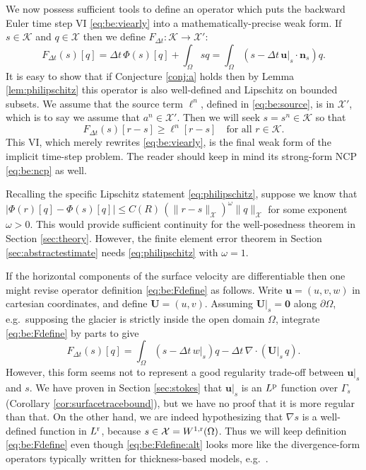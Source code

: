 \documentclass[hidelinks,onefignum,onetabnum,final]{siamart220329}  %
\newcommand{\grad}{\nabla}
\newcommand{\Div}{\nabla\cdot}
\newcommand{\bn}{\mathbf{n}}
\newcommand{\bu}{\mathbf{u}}
\newcommand{\bU}{\mathbf{U}}
\newcommand{\bzero}{\bm{0}}
\newcommand{\cK}{\mathcal{K}}
\newcommand{\cX}{\mathcal{X}}
\newcommand{\pp}{{\text{\textnormal{p}}}}
\newcommand{\rr}{{\text{\textnormal{r}}}}
\begin{document}
We now possess sufficient tools to define an operator which puts the backward Euler time step VI \eqref{eq:be:viearly} into a mathematically-precise weak form.  If $s\in\cK$ and $q\in\cX$ then we define $F_{\Delta t}:\cK\to\cX'$:
\begin{equation}
F_{\Delta t}(s)[q] = \Delta t\,\Phi(s)[q] + \int_\Omega s q = \int_\Omega \left(s - \Delta t\, \bu|_s \cdot \bn_s\right) q.  \label{eq:be:Fdefine}
\end{equation}
It is easy to show that if Conjecture \ref{conj:a} holds then by Lemma \ref{lem:philipschitz} this operator is also well-defined and Lipschitz on bounded subsets.  We assume that the source term $\ell^n$, defined in \eqref{eq:be:source}, is in $\cX'$, which is to say we assume that $a^n\in\cX'$.  Then we will seek $s = s^n \in \cK$ so that
\begin{equation}
\boxed{F_{\Delta t}(s)[r-s] \ge \ell^n[r-s] \quad \text{for all } r \in \cK.} \label{eq:be:vi}
\end{equation}
This VI, which merely rewrites \eqref{eq:be:viearly}, is the final weak form of the implicit time-step problem.  The reader should keep in mind its strong-form NCP \eqref{eq:be:ncp} as well.

Recalling the specific Lipschitz statement \eqref{eq:philipschitz}, suppose we know that $\Big|\Phi(r)[q] - \Phi(s)[q]\Big| \le C(R)\, (\|r-s\|_{\cX})^\omega \|q\|_{\cX}$ for some exponent $\omega>0$.  This would provide sufficient continuity for the well-posedness theorem in Section \ref{sec:theory}.  However, the finite element error theorem in Section \ref{sec:abstractestimate} needs \eqref{eq:philipschitz} with $\omega=1$.

If the horizontal components of the surface velocity are differentiable then one might revise operator definition \eqref{eq:be:Fdefine} as follows.  Write $\bu=(u,v,w)$ in cartesian coordinates, and define $\bU=(u,v)$.  Assuming $\bU|_s=\bzero$ along $\partial\Omega$, e.g.~supposing the glacier is strictly inside the open domain $\Omega$, integrate \eqref{eq:be:Fdefine} by parts to give
\begin{equation}
F_{\Delta t}(s)[q] = \int_\Omega \left(s - \Delta t\, w|_s\right) q - \Delta t\, \Div\left(\bU|_s\, q\right).  \label{eq:be:Fdefine:alt}
\end{equation}
However, this form seems not to represent a good regularity trade-off between $\bu|_s$ and $s$.  We have proven in Section \ref{sec:stokes} that $\bu|_s$ is an $L^\pp$ function over $\Gamma_s$ (Corollary \ref{cor:surfacetracebound}), but we have no proof that it is more regular than that.  On the other hand, we are indeed hypothesizing that $\grad s$ is a well-defined function in $L^\rr$, because $s\in\cX=W^{1,\rr}(\Omega)$.  Thus we will keep definition \eqref{eq:be:Fdefine} even though \eqref{eq:be:Fdefine:alt} looks more like the divergence-form operators typically written for thickness-based models, e.g.~\cite{Bueler2021conservation,JouvetBueler2012}.
\end{document}
